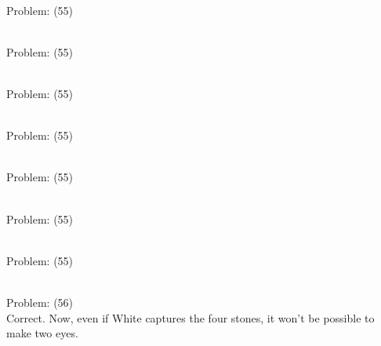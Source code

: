 \documentclass[11pt]{article}
\begin{document}
\begin{minipage}[t]{0.5\textwidth}
  {\centering
  
\\
Problem: (55)\\
  }
\end{minipage}
\begin{minipage}[t]{0.5\textwidth}
  {\centering
  
\\
Problem: (55)\\
  }
\end{minipage}
\begin{minipage}[t]{0.5\textwidth}
  {\centering
  
\\
Problem: (55)\\
  }
\end{minipage}
\begin{minipage}[t]{0.5\textwidth}
  {\centering
  
\\
Problem: (55)\\
  }
\end{minipage}
\begin{minipage}[t]{0.5\textwidth}
  {\centering
  
\\
Problem: (55)\\
  }
\end{minipage}
\begin{minipage}[t]{0.5\textwidth}
  {\centering
  
\\
Problem: (55)\\
  }
\end{minipage}
\begin{minipage}[t]{0.5\textwidth}
  {\centering
  
\\
Problem: (55)\\
  }
\end{minipage}
\begin{minipage}[t]{0.5\textwidth}
  {\centering
  
\\
Problem: (56)\\
Correct. Now, even if White captures the four stones, it won't be possible to make two eyes.\\
  }
\end{minipage}
\end{document}
